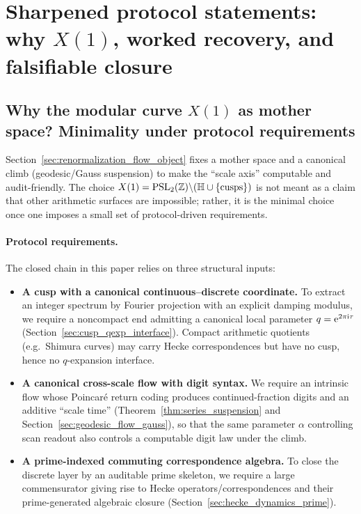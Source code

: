 \section{Sharpened protocol statements: why \texorpdfstring{$X(1)$}{X(1)}, worked recovery, and falsifiable closure}
\label{app:protocol_sharpening}

\subsection{Why the modular curve \texorpdfstring{$X(1)$}{X(1)} as mother space? Minimality under protocol requirements}
\label{app:why_X1}

Section~\ref{sec:renormalization_flow_object} fixes a mother space and a canonical climb (geodesic/Gauss suspension) to make the ``scale axis'' computable and audit-friendly.
The choice $X(1)=\mathrm{PSL}_2(\mathbb{Z})\backslash(\mathbb{H}\cup\{\text{cusps}\})$ is not meant as a claim that other arithmetic surfaces are impossible; rather, it is the minimal choice once one imposes a small set of protocol-driven requirements.
\par
\paragraph{Protocol requirements.}
The closed chain in this paper relies on three structural inputs:
\begin{itemize}
\item \textbf{A cusp with a canonical continuous--discrete coordinate.}
To extract an integer spectrum by Fourier projection with an explicit damping modulus, we require a noncompact end admitting a canonical local parameter $q=\mathrm{e}^{2\pi\mathrm{i}\tau}$ (Section~\ref{sec:cusp_qexp_interface}).
Compact arithmetic quotients (e.g.\ Shimura curves) may carry Hecke correspondences but have no cusp, hence no $q$-expansion interface.
\item \textbf{A canonical cross-scale flow with digit syntax.}
We require an intrinsic flow whose Poincar\'e return coding produces continued-fraction digits and an additive ``scale time'' (Theorem~\ref{thm:series_suspension} and Section~\ref{sec:geodesic_flow_gauss}), so that the same parameter $\alpha$ controlling scan readout also controls a computable digit law under the climb.
\item \textbf{A prime-indexed commuting correspondence algebra.}
To close the discrete layer by an auditable prime skeleton, we require a large commensurator giving rise to Hecke operators/correspondences and their prime-generated algebraic closure (Section~\ref{sec:hecke_dynamics_prime}).
\end{itemize}

